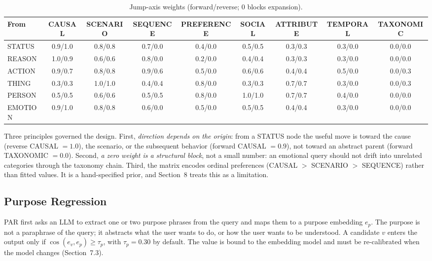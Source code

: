 \documentclass[11pt]{article}
\begin{document}
\begin{table}[t]
  \centering
  \footnotesize
  \setlength{\tabcolsep}{3pt}
  \begin{tabular}{@{}lcccccccc@{}}
    \toprule
    From & CAUSAL & SCENARIO & SEQUENCE & PREFERENCE & SOCIAL & ATTRIBUTE & TEMPORAL & TAXONOMIC \\
    \midrule
    STATUS  & 0.9/1.0 & 0.8/0.8 & 0.7/0.0 & 0.4/0.0 & 0.5/0.5 & 0.3/0.3 & 0.3/0.0 & 0.0/0.0 \\
    REASON  & 1.0/0.9 & 0.6/0.6 & 0.8/0.0 & 0.2/0.0 & 0.4/0.4 & 0.3/0.3 & 0.3/0.0 & 0.0/0.0 \\
    ACTION  & 0.9/0.7 & 0.8/0.8 & 0.9/0.6 & 0.5/0.0 & 0.6/0.6 & 0.4/0.4 & 0.5/0.0 & 0.0/0.3 \\
    THING   & 0.3/0.3 & 1.0/1.0 & 0.4/0.4 & 0.8/0.0 & 0.3/0.3 & 0.7/0.7 & 0.3/0.0 & 0.0/0.3 \\
    PERSON  & 0.5/0.5 & 0.6/0.6 & 0.5/0.5 & 0.8/0.0 & 1.0/1.0 & 0.7/0.7 & 0.4/0.0 & 0.0/0.0 \\
    EMOTION & 0.9/1.0 & 0.8/0.8 & 0.6/0.0 & 0.5/0.0 & 0.5/0.5 & 0.4/0.4 & 0.3/0.0 & 0.0/0.0 \\
    \bottomrule
  \end{tabular}
  \caption{Jump-axis weights (forward/reverse; $0$ blocks expansion).}\label{tab:jumpaxis}
\end{table}

Three principles governed the design. First, \emph{direction depends on the origin}: from a
STATUS node the useful move is toward the cause (reverse CAUSAL $=1.0$), the scenario, or the
subsequent behavior (forward CAUSAL $=0.9$), not toward an abstract parent (forward TAXONOMIC
$=0.0$). Second, \emph{a zero weight is a structural block}, not a small number: an emotional
query should not drift into unrelated categories through the taxonomy chain. Third, the matrix
encodes ordinal preferences (CAUSAL $>$ SCENARIO $>$ SEQUENCE) rather than fitted values. It is
a hand-specified prior, and Section~8 treats this as a limitation.

\subsection{Purpose Regression}

PAR first asks an LLM to extract one or two purpose phrases from the query and maps them to a
purpose embedding $e_p$. The purpose is not a paraphrase of the query; it abstracts what the
user wants to do, or how the user wants to be understood. A candidate $v$ enters the output
only if $\cos(e_v,e_p)\ge\tau_p$, with $\tau_p=0.30$ by default. The value is bound to the
embedding model and must be re-calibrated when the model changes (Section~7.3).
\end{document}
